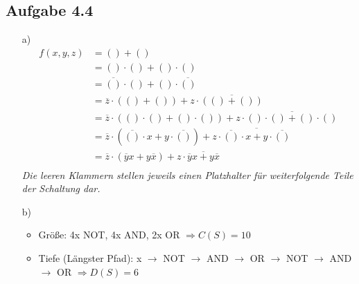 \documentclass{article}
\newcommand{\nyet}{\overline}
\begin{document}
    \subsection*{Aufgabe 4.4}
    \begin{enumerate}
        \item[a)]
        \begin{align*}
            f(x,y,z) &= () + () \\
            &= () \cdot () + () \cdot () \\
            &= \nyet{()} \cdot () + () \cdot \nyet{()} \\
            &= \nyet{z} \cdot (() + ()) + z \cdot \nyet{(() + ())} \\
            &= \nyet{z} \cdot (()\cdot () + ()\cdot ()) + z \cdot \nyet{()\cdot () + ()\cdot ()} \\
            &= \nyet{z} \cdot (\nyet{()}\cdot x + y\cdot \nyet{()}) + z \cdot \nyet{\nyet{()}\cdot x + y\cdot \nyet{()}} \\
            &= \nyet{z} \cdot (\nyet{y} x + y \nyet{x}) + z \cdot \nyet{\nyet{y} x + y \nyet{x}} \\
        \end{align*}
        \textit{Die leeren Klammern stellen jeweils einen Platzhalter für weiterfolgende Teile der Schaltung dar.}
        \item[b)]
        \begin{itemize}
            \item Größe: 4x NOT, 4x AND, 2x OR $\Rightarrow C(S) = 10$
            \item Tiefe (Längster Pfad): x $\rightarrow$ NOT $\rightarrow$ AND $\rightarrow$ OR $\rightarrow$ NOT $\rightarrow$ AND $\rightarrow$ OR $\Rightarrow D(S)=6$
        \end{itemize}
    \end{enumerate}
\end{document}
